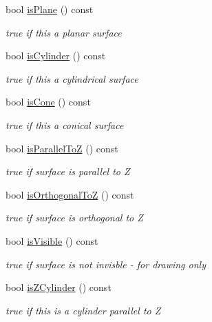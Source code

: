 \begin{DoxyCompactItemize}
bool \hyperlink{class_d_d_surfaces_1_1_surface_type_a41f77605ca254ef25add409173faf25b}{is\+Plane} () const
\begin{DoxyCompactList}\small\item\em true if this a planar surface \end{DoxyCompactList}\item 
bool \hyperlink{class_d_d_surfaces_1_1_surface_type_a414afb21b662a7fe88aac14a8c885090}{is\+Cylinder} () const
\begin{DoxyCompactList}\small\item\em true if this a cylindrical surface \end{DoxyCompactList}\item 
bool \hyperlink{class_d_d_surfaces_1_1_surface_type_aae3940eb9d84d8695b73291a006e9d87}{is\+Cone} () const
\begin{DoxyCompactList}\small\item\em true if this a conical surface \end{DoxyCompactList}\item 
bool \hyperlink{class_d_d_surfaces_1_1_surface_type_a1e22236a499e5825782138d9bdcb6889}{is\+Parallel\+ToZ} () const
\begin{DoxyCompactList}\small\item\em true if surface is parallel to Z \end{DoxyCompactList}\item 
bool \hyperlink{class_d_d_surfaces_1_1_surface_type_a748cc10a2f80c209ffb257590787e28c}{is\+Orthogonal\+ToZ} () const
\begin{DoxyCompactList}\small\item\em true if surface is orthogonal to Z \end{DoxyCompactList}\item 
bool \hyperlink{class_d_d_surfaces_1_1_surface_type_abcf9f499556546f6717f706a05afee96}{is\+Visible} () const
\begin{DoxyCompactList}\small\item\em true if surface is not invisble -\/ for drawing only \end{DoxyCompactList}\item 
bool \hyperlink{class_d_d_surfaces_1_1_surface_type_a28938c3a776ef5541e0c1eeb41873d00}{is\+Z\+Cylinder} () const
\begin{DoxyCompactList}\small\item\em true if this is a cylinder parallel to Z \end{DoxyCompactList}\item 

\end{DoxyCompactItemize}
